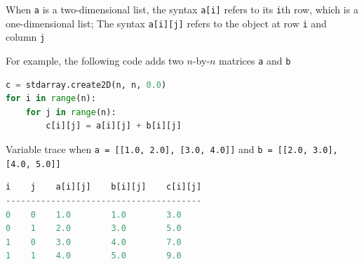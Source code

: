 \documentclass[8pt,a4paper,compress]{beamer}
\begin{document}
\begin{frame}[fragile]
\pause

When \lstinline{a} is a two-dimensional list, the syntax \lstinline{a[i]} refers to its \lstinline{i}th row, which is a one-dimensional list; The syntax \lstinline{a[i][j]} refers to the object at row \lstinline{i} and column \lstinline{j}

\pause
\bigskip

For example, the following code adds two $n$-by-$n$ matrices \lstinline{a} and \lstinline{b}

\begin{lstlisting}[language=Python]
c = stdarray.create2D(n, n, 0.0)
for i in range(n):
    for j in range(n):
        c[i][j] = a[i][j] + b[i][j]
\end{lstlisting}

\pause

Variable trace when \lstinline{a = [[1.0, 2.0], [3.0, 4.0]]} and \lstinline{b = [[2.0, 3.0], [4.0, 5.0]]}
\begin{lstlisting}[language=Python]
i    j    a[i][j]    b[i][j]    c[i][j]
---------------------------------------
0    0    1.0        1.0        3.0
0    1    2.0        3.0        5.0
1    0    3.0        4.0        7.0
1    1    4.0        5.0        9.0
\end{lstlisting}
\end{frame}
\end{document}
